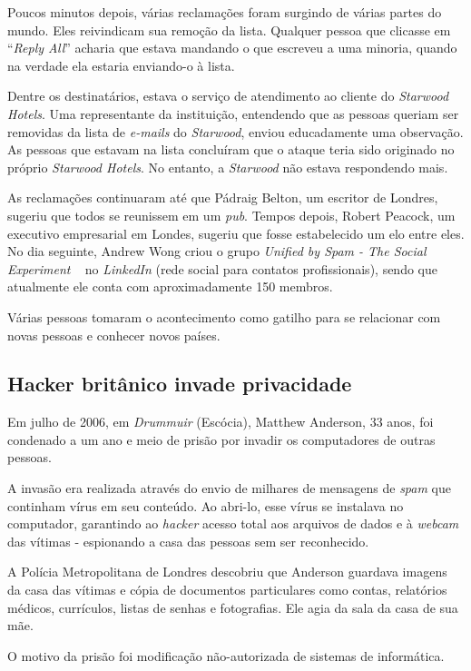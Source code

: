 \documentclass[a4paper,dvipdfm]{article}
\begin{document}
		Poucos minutos depois, várias reclamações foram surgindo de várias partes do mundo. Eles reivindicam sua remoção da lista.
	Qualquer pessoa que clicasse em ``\emph{Reply All}'' acharia que estava mandando o que escreveu a uma minoria, quando na verdade ela 		estaria enviando-o à lista.

		Dentre os destinatários, estava o serviço de atendimento ao cliente do \emph{Starwood Hotels}. Uma representante da instituição,
	entendendo que as pessoas queriam ser removidas da lista de \emph{e-mails} do \emph{Starwood}, enviou educadamente uma observação. As
	pessoas que estavam na lista concluíram que o ataque teria sido originado no próprio \emph{Starwood Hotels}. No entanto, a \emph{Starwood} não estava respondendo mais.

		As reclamações continuaram até que Pádraig Belton, um escritor de Londres, sugeriu que todos se reunissem em um \emph{pub}.
	Tempos depois, Robert Peacock, um executivo empresarial em Londes, sugeriu que fosse estabelecido um elo entre eles. No dia
	seguinte, Andrew Wong criou o grupo \emph{Unified by Spam - The Social Experiment} ~\cite{ubs} no \emph{LinkedIn} (rede social para contatos
	profissionais), sendo que atualmente ele conta com aproximadamente 150 membros.

		Várias pessoas tomaram o acontecimento como gatilho para se relacionar com novas pessoas e conhecer novos países.~\cite{cr:ubs}

	\subsection {Hacker britânico invade privacidade}
        Em julho de 2006, em \emph{Drummuir} (Escócia), Matthew Anderson, 33 anos, foi
condenado a um ano e meio de
	prisão por invadir os computadores de outras pessoas.

	    A invasão era realizada através do envio de milhares de mensagens de
    \emph{spam} que continham vírus em seu conteúdo. Ao abri-lo, esse vírus se
    instalava no computador, garantindo ao \emph{hacker} acesso total aos arquivos de
dados e à \emph{webcam} das vítimas - espionando a casa das pessoas sem ser
reconhecido.

	    A Polícia Metropolitana de Londres descobriu que Anderson guardava
    imagens da casa das vítimas e cópia de documentos particulares como contas,
    relatórios médicos, currículos, listas de senhas e fotografias.
        Ele agia da sala da casa de sua mãe.

	O motivo da prisão foi modificação não-autorizada de sistemas de informática.
\end{document}
